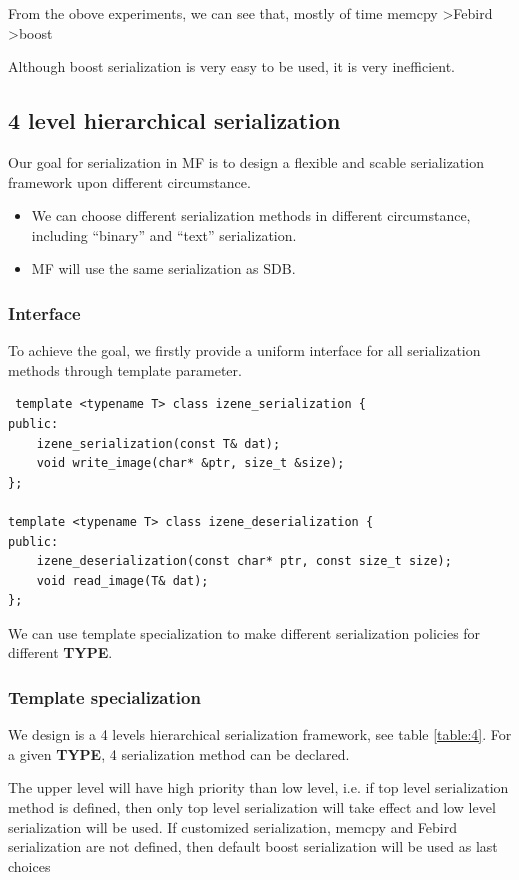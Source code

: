 \documentclass[a4paper,10pt]{article}
\begin{document}
From the obove experiments, we can see that, mostly of time
 memcpy \textgreater Febird \textgreater boost

 Although boost serialization is very easy to be used, it is very
 inefficient.

\subsection{4 level hierarchical serialization}
Our goal for serialization in MF is to design a flexible and scable
serialization framework upon different circumstance.
\begin{itemize}
\item  We can choose different serialization methods in different circumstance, including “binary” and “text” serialization.

\item  MF will use the same serialization as SDB.
\end{itemize}

\subsubsection{Interface}
To achieve the goal, we firstly provide a uniform interface for all
serialization methods through template parameter.
\begin{lstlisting}
 template <typename T> class izene_serialization {
public:
    izene_serialization(const T& dat);
    void write_image(char* &ptr, size_t &size);
};

template <typename T> class izene_deserialization {
public:
    izene_deserialization(const char* ptr, const size_t size);
    void read_image(T& dat);
};
\end{lstlisting}

We can use template specialization to make different serialization
policies  for different \textbf{TYPE}.

\subsubsection{Template specialization}
We design is a 4 levels hierarchical serialization framework, see
table \ref{table:4}. For a given \textbf{TYPE}, 4 serialization
method can be declared.

The upper level will have high priority than low level, i.e. if  top
level serialization method is defined, then only top level
serialization will  take effect and low level serialization will be
used. If customized serialization, memcpy and Febird serialization
are not defined, then default boost serialization will be used as
last choices
\end{document}
